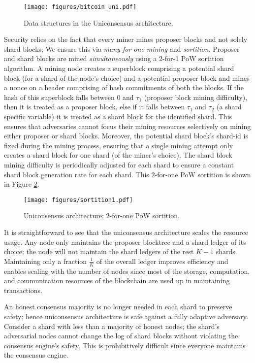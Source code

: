 \documentclass{article}
\begin{document}
\begin{figure}
     \centering
     \texttt{[image: figures/bitcoin\_uni.pdf]}
   \caption{Data structures in the Uniconsensus architecture. }
   \label{fig:uniconsensus}
\end{figure}

Security relies on the fact that every miner mines proposer blocks and not solely shard blocks; We ensure this via {\em many-for-one mining} and {\em sortition}. Proposer and shard blocks are mined {\em simultaneously} using a $2$-for-1 PoW sortition algorithm. A mining node creates a superblock comprising a potential shard block (for a shard of the node's choice) and a potential proposer block and mines a nonce on a header comprising of hash commitments of both the blocks. If the hash of this superblock falls between $0$ and $\tau_1$ (proposer block mining difficulty), then it is treated as a proposer block, else if it falls between $\tau_1$ and $\tau_2$ (a shard specific variable) it is treated as a shard block for the identified shard. This ensures that adversaries cannot focus their mining resources selectively on mining either proposer or shard blocks. Moreover, the potential shard block's shard-id is fixed during the mining process, ensuring that a single mining attempt only creates a shard block for one shard (of the miner's choice). The shard block mining difficulty is periodically adjusted for each shard to ensure a constant shard block generation rate for each shard. This $2$-for-one PoW sortition is shown in Figure \ref{fig:sortition}.

\begin{figure}
     \centering
     \texttt{[image: figures/sortition1.pdf]}
   \caption{Uniconsensus architecture: $2$-for-one PoW sortition.}
   \label{fig:sortition}
\end{figure}

It is straightforward to see that the uniconsensus architecture scales the resource usage. Any node only maintains the proposer blocktree and a shard ledger of its choice; the node will not maintain the shard ledgers of the rest $K-1$ shards. Maintaining only a fraction $\frac{1}{K}$ of the overall ledger improves efficiency and enables scaling with the number of nodes since most of the storage, computation, and communication resources of the blockchain are used up in maintaining transactions.

An honest consensus majority is no longer needed in each shard to preserve safety; hence uniconsensus architecture is safe against a fully adaptive adversary. Consider a shard with less than a majority of honest nodes; the shard's adversarial nodes cannot change the log of shard blocks without violating the consensus engine's safety. This is prohibitively difficult since everyone maintains the consensus engine. 
\end{document}
